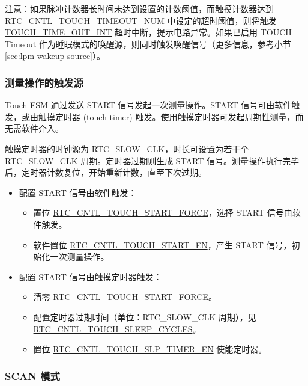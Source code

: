 \documentclass[main\_\_CN.tex]{subfiles}
\begin{document}
注意：如果脉冲计数器长时间未达到设置的计数阈值，而触摸计数器达到 \hyperref[fielddesc:RTCCNTLTOUCHTIMEOUTNUM]{RTC\_CNTL\_TOUCH\_TIMEOUT\_NUM} 中设定的超时阈值，则将触发\hyperref[interrupt:TOUCHTIMEOUTINT]{ TOUCH\_TIME\_OUT\_INT} 超时中断，提示电路异常。如果已启用 TOUCH Timeout 作为睡眠模式的唤醒源，则同时触发唤醒信号（更多信息，参考小节 \ref{sec:lpm-wakeup-source}）。

\subsubsection{测量操作的触发源}


Touch FSM 通过发送 START 信号发起一次测量操作。START 信号可由软件触发，或由触摸定时器 (touch timer) 触发。使用触摸定时器可发起周期性测量，而无需软件介入。

触摸定时器的时钟源为 RTC\_SLOW\_CLK，时长可设置为若干个 RTC\_SLOW\_CLK 周期。定时器过期则生成 START 信号。测量操作执行完毕后，定时器计数复位，开始重新计数，直至下次过期。

\begin{itemize}
    \item 配置 START 信号由软件触发：
    \begin{itemize}
        \item 置位 \hyperref[fielddesc:RTCCNTLTOUCHSTARTFORCE]{RTC\_CNTL\_TOUCH\_START\_FORCE}，选择 START 信号由软件触发。
        \item 软件置位 \hyperref[fielddesc:RTCCNTLTOUCHSTARTEN]{RTC\_CNTL\_TOUCH\_START\_EN}，产生 START 信号，初始化一次测量操作。
    \end{itemize}
    \item 配置 START 信号由触摸定时器触发：
    \begin{itemize}
        \item 清零 \hyperref[fielddesc:RTCCNTLTOUCHSTARTFORCE]{RTC\_CNTL\_TOUCH\_START\_FORCE}。
        \item 配置定时器过期时间（单位：RTC\_SLOW\_CLK 周期），见 \hyperref[fielddesc:RTCCNTLTOUCHSLEEPCYCLES]{RTC\_CNTL\_TOUCH\_SLEEP\_CYCLES}。
        \item 置位 \hyperref[fielddesc:RTCCNTLTOUCHSLPTIMEREN]{RTC\_CNTL\_TOUCH\_SLP\_TIMER\_EN} 使能定时器。
    \end{itemize}
\end{itemize}

\subsubsection{SCAN 模式}
\end{document}
